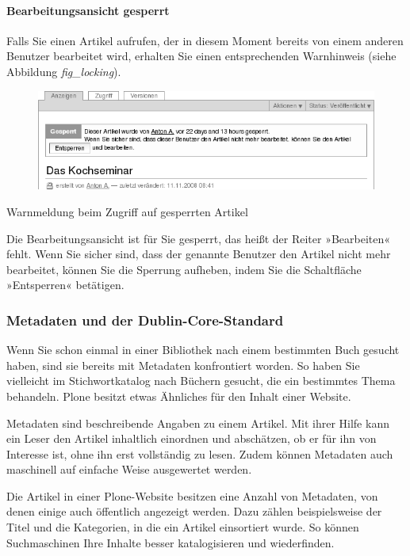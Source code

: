 \documentclass[a4paper,12pt,ngerman]{manual}
\begin{document}
\paragraph{Bearbeitungsansicht gesperrt}

Falls Sie einen Artikel aufrufen, der in diesem Moment bereits von einem
anderen Benutzer bearbeitet wird, erhalten Sie einen entsprechenden
Warnhinweis (siehe Abbildung \emph{fig\_locking}).
\hypertarget{fig-locking}{}\begin{figure}[htbp]
\centering

\includegraphics{locking.png}
\end{figure}

Warnmeldung beim Zugriff auf gesperrten Artikel

Die Bearbeitungsansicht ist
für Sie gesperrt, das heißt der Reiter »Bearbeiten« fehlt. Wenn Sie sicher
sind, dass der genannte Benutzer den Artikel nicht mehr bearbeitet, können Sie
die Sperrung aufheben, indem Sie die Schaltfläche »Entsperren« betätigen.
\hypertarget{sec-exkurs-metadaten}{}

\subsubsection{Metadaten und der Dublin-Core-Standard}

Wenn Sie schon einmal in einer Bibliothek nach einem bestimmten Buch gesucht
haben, sind sie bereits mit Metadaten konfrontiert worden. So haben Sie
vielleicht im Stichwortkatalog nach Büchern gesucht, die ein bestimmtes Thema
behandeln. Plone besitzt etwas Ähnliches für den Inhalt einer Website.

Metadaten sind beschreibende Angaben zu einem Artikel.  Mit ihrer Hilfe kann
ein Leser den Artikel inhaltlich einordnen und abschätzen, ob er für ihn von
Interesse ist, ohne ihn erst vollständig zu lesen.  Zudem können Metadaten
auch maschinell auf einfache Weise ausgewertet werden.

Die Artikel in einer Plone-Website besitzen eine Anzahl von Metadaten, von
denen einige auch öffentlich angezeigt werden. Dazu
zählen beispielsweise der Titel und die Kategorien, in die ein Artikel
einsortiert wurde. So können Suchmaschinen Ihre Inhalte besser katalogisieren
und wiederfinden.
\end{document}
